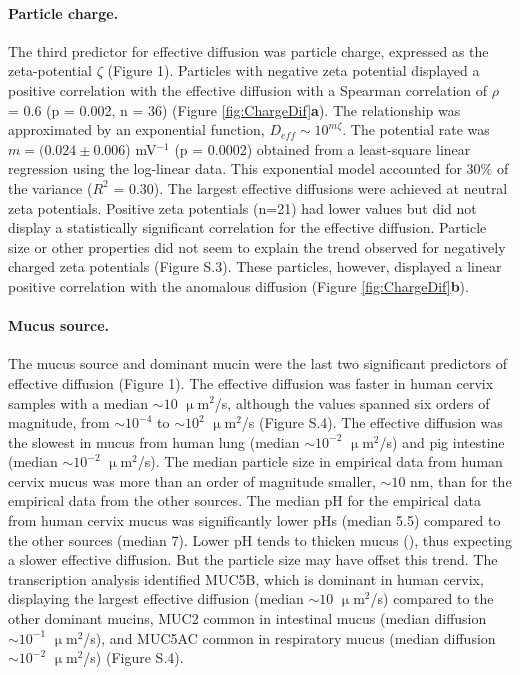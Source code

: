 \documentclass[aps,prl,preprint,superscriptaddress,showkeys,linenumbers]{revtex4-1}
\begin{document}
\paragraph{Particle charge.} The third predictor for effective diffusion was particle charge, expressed as the zeta-potential $\zeta$ (Figure 1).  Particles with negative zeta potential displayed a positive correlation with the effective diffusion  with a Spearman correlation of $\rho$ = 0.6 (p = 0.002, n = 36) (Figure \ref{fig:ChargeDif}\textbf{a}). The relationship was approximated by an exponential function, $D_{eff} \sim 10^{m\zeta }$. The potential rate was $m = (0.024 \pm 0.006$)  mV$^{-1}$ (p = 0.0002) obtained from a least-square linear regression using the log-linear data. This exponential model accounted for 30$\%$ of the variance ($R^2$ = 0.30). The largest effective diffusions were achieved at neutral zeta potentials. Positive zeta potentials (n=21) had lower values but did not display a statistically significant correlation for the effective diffusion. Particle size or other properties did not seem to explain the trend observed for negatively charged zeta potentials (Figure S.3). These particles, however, displayed a linear positive correlation with the anomalous diffusion (Figure \ref{fig:ChargeDif}\textbf{b}).

\paragraph{Mucus source.} The mucus source and dominant mucin were the last two significant predictors of effective diffusion (Figure 1). The effective diffusion was faster in human cervix samples with a median $\sim 10$ $\upmu$m$^2$/s, although the values spanned six orders of magnitude, from $\sim 10^{-4}$ to $\sim 10^2$ $\upmu$m$^2$/s (Figure S.4). The effective diffusion was the slowest in mucus from human lung (median $\sim 10^{-2}$ $\upmu$m$^2$/s) and pig intestine (median $\sim 10^{-2}$ $\upmu$m$^2$/s). The median particle size in empirical data from human cervix mucus was more than an order of magnitude smaller, $\sim 10$ nm, than for the empirical data from the other sources. The median pH for the empirical data from human cervix mucus was significantly lower pHs (median 5.5) compared to the other sources (median 7). Lower pH tends to thicken mucus (\citealt{Hwang1969RheolActa}), thus expecting a slower effective diffusion. But the particle size may have offset this trend. The transcription analysis identified MUC5B, which is dominant in human cervix, displaying the largest effective diffusion (median $\sim 10$ $\upmu$m$^2$/s) compared to the other dominant mucins, MUC2 common in intestinal mucus (median diffusion $\sim 10^{-1}$ $\upmu$m$^2$/s), and MUC5AC common in respiratory mucus (median diffusion $\sim 10^{-2}$ $\upmu$m$^2$/s) (Figure S.4).
\end{document}
